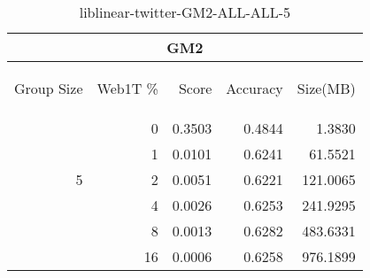 \begin{center}
\begin{table}[htbp] 
 \begin{center}
\begin{tabular}{ | r | r | r | r | r |}
\hline
\multicolumn{5}{|c|}{GM2}\\
\hline
\begin{sideways}Group Size\end{sideways} & \begin{sideways}Web1T \%\end{sideways} & \begin{sideways}Score\end{sideways} & \begin{sideways}Accuracy\end{sideways} & \begin{sideways}Size(MB)\end{sideways}\\
\hline
\multirow{5}{*}{5}
 & 0 & 0.3503 & 0.4844 & 1.3830\\ \cline{2-5}
 & 1 & 0.0101 & 0.6241 & 61.5521\\ \cline{2-5}
 & 2 & 0.0051 & 0.6221 & 121.0065\\ \cline{2-5}
 & 4 & 0.0026 & 0.6253 & 241.9295\\ \cline{2-5}
 & 8 & 0.0013 & 0.6282 & 483.6331\\ \cline{2-5}
 & 16 & 0.0006 & 0.6258 & 976.1899\\ \cline{2-5}
\hline
\end{tabular}
\caption{liblinear-twitter-GM2-ALL-ALL-5}
\label{table:liblinear-twitter-GM2-ALL-ALL-5}
\end{center}
 \end{table}
\end{center}

